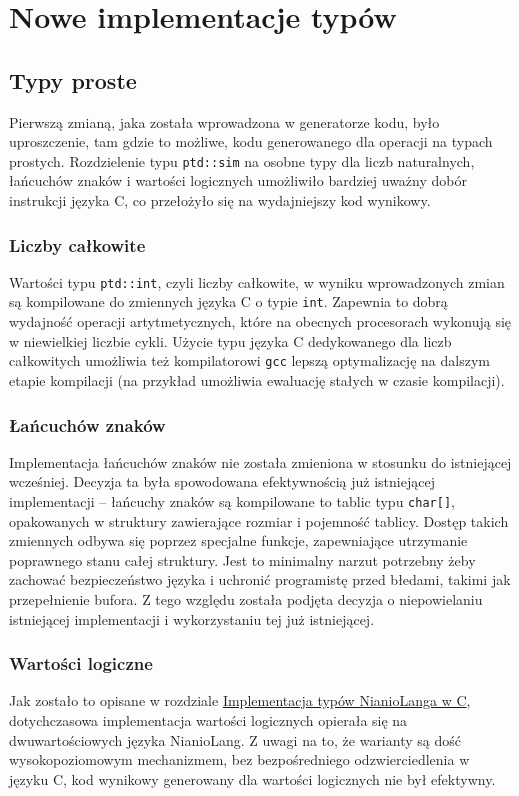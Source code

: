 \documentclass[licencjacka]{pracamgr}
\begin{document}
\chapter{Nowe implementacje typów}
\section{Typy proste}
Pierwszą zmianą, jaka została wprowadzona w generatorze kodu, było uproszczenie,
tam gdzie to możliwe, kodu generowanego dla operacji na typach prostych.
Rozdzielenie typu \texttt{ptd::sim} na osobne typy dla liczb naturalnych,
łańcuchów znaków i wartości logicznych umożliwiło bardziej uważny dobór instrukcji języka C,
co przełożyło się na wydajniejszy kod wynikowy.

\subsection{Liczby całkowite}
Wartości typu \texttt{ptd::int}, czyli liczby całkowite, w wyniku wprowadzonych zmian są kompilowane
do zmiennych języka C o typie \texttt{int}. Zapewnia to dobrą wydajność operacji artytmetycznych,
które na obecnych procesorach wykonują się w niewielkiej liczbie cykli. Użycie typu języka C
dedykowanego dla liczb całkowitych umożliwia też kompilatorowi \texttt{gcc} lepszą optymalizację
na dalszym etapie kompilacji (na przykład umożliwia ewaluację stałych w czasie kompilacji).
\subsection{Łańcuchów znaków}
Implementacja łańcuchów znaków nie została zmieniona w stosunku do istniejącej wcześniej.
Decyzja ta była spowodowana efektywnością już istniejącej implementacji -- łańcuchy znaków
są kompilowane to tablic typu \texttt{char[]}, opakowanych w struktury zawierające
rozmiar i pojemność tablicy. Dostęp takich zmiennych odbywa się poprzez specjalne funkcje,
zapewniające utrzymanie poprawnego stanu całej struktury. Jest to minimalny narzut potrzebny żeby
zachować bezpieczeństwo języka i uchronić programistę przed błedami, takimi jak przepełnienie bufora.
Z tego względu została podjęta decyzja o niepowielaniu istniejącej implementacji i wykorzystaniu
tej już istniejącej.
\subsection{Wartości logiczne}
Jak zostało to opisane w rozdziale \hyperref[sec:c_types_implementation]{Implementacja typów NianioLanga w C}, dotychczasowa implementacja wartości logicznych opierała się na dwuwartościowych
języka NianioLang. Z uwagi na to, że warianty są dość wysokopoziomowym mechanizmem, bez
bezpośredniego odzwierciedlenia w języku C, kod wynikowy generowany dla wartości logicznych nie był
efektywny.
\end{document}
